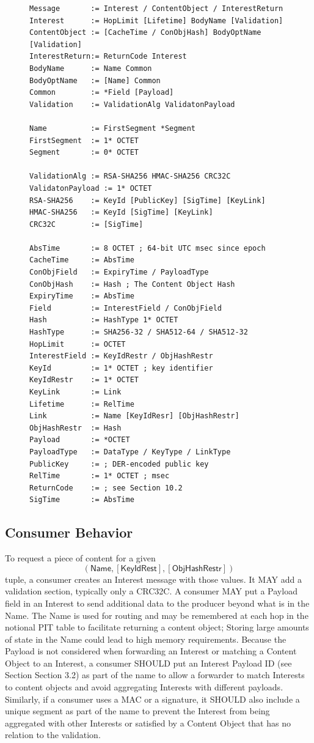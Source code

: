 \documentclass[12pt]{article}
\begin{document}
\begin{figure}
\begin{verbatim}
Message       := Interest / ContentObject / InterestReturn
Interest      := HopLimit [Lifetime] BodyName [Validation]
ContentObject := [CacheTime / ConObjHash] BodyOptName [Validation]
InterestReturn:= ReturnCode Interest
BodyName      := Name Common
BodyOptName   := [Name] Common
Common        := *Field [Payload]
Validation    := ValidationAlg ValidatonPayload

Name          := FirstSegment *Segment
FirstSegment  := 1* OCTET
Segment       := 0* OCTET

ValidationAlg := RSA-SHA256 HMAC-SHA256 CRC32C
ValidatonPayload := 1* OCTET
RSA-SHA256    := KeyId [PublicKey] [SigTime] [KeyLink]
HMAC-SHA256   := KeyId [SigTime] [KeyLink]
CRC32C        := [SigTime]

AbsTime       := 8 OCTET ; 64-bit UTC msec since epoch
CacheTime     := AbsTime
ConObjField   := ExpiryTime / PayloadType
ConObjHash    := Hash ; The Content Object Hash
ExpiryTime    := AbsTime
Field         := InterestField / ConObjField
Hash          := HashType 1* OCTET
HashType      := SHA256-32 / SHA512-64 / SHA512-32
HopLimit      := OCTET
InterestField := KeyIdRestr / ObjHashRestr
KeyId         := 1* OCTET ; key identifier
KeyIdRestr    := 1* OCTET
KeyLink       := Link
Lifetime      := RelTime
Link          := Name [KeyIdResr] [ObjHashRestr]
ObjHashRestr  := Hash
Payload       := *OCTET
PayloadType   := DataType / KeyType / LinkType
PublicKey     := ; DER-encoded public key
RelTime       := 1* OCTET ; msec
ReturnCode    := ; see Section 10.2
SigTime       := AbsTime
\end{verbatim}
\end{figure}

\subsection{Consumer Behavior}
To request a piece of content for a given
$$
(\mathsf{Name}, [\mathsf{KeyIdRest}], [\mathsf{ObjHashRestr}])
$$
tuple, a consumer creates an Interest message with
those values.  It MAY add a validation section, typically only a
CRC32C.  A consumer MAY put a Payload field in an Interest to send
additional data to the producer beyond what is in the Name.  The Name
is used for routing and may be remembered at each hop in the notional
PIT table to facilitate returning a content object; Storing large
amounts of state in the Name could lead to high memory requirements.
Because the Payload is not considered when forwarding an Interest or
matching a Content Object to an Interest, a consumer SHOULD put an
Interest Payload ID (see Section Section 3.2) as part of the name to
allow a forwarder to match Interests to content objects and avoid
aggregating Interests with different payloads.  Similarly, if a
consumer uses a MAC or a signature, it SHOULD also include a unique
segment as part of the name to prevent the Interest from being
aggregated with other Interests or satisfied by a Content Object that
has no relation to the validation.
\end{document}
